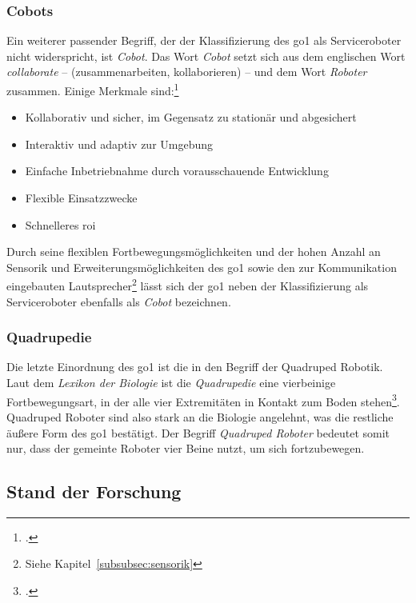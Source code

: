 \subsubsection{Cobots}

Ein weiterer passender Begriff, der der Klassifizierung des \gls{go1} als Serviceroboter nicht widerspricht, ist \emph{Cobot}.
Das Wort \emph{Cobot} setzt sich aus dem englischen Wort \emph{collaborate} -- (zusammenarbeiten, kollaborieren) -- und dem Wort \emph{Roboter}
zusammen.
Einige Merkmale sind:\footcite{statista_robotics_market}

\begin{itemize}
    \item Kollaborativ und sicher, im Gegensatz zu stationär und abgesichert
    \item Interaktiv und adaptiv zur Umgebung
    \item Einfache Inbetriebnahme durch vorausschauende Entwicklung
    \item Flexible Einsatzzwecke
    \item Schnelleres \gls{roi}
\end{itemize}

Durch seine flexiblen Fortbewegungsmöglichkeiten und der hohen Anzahl an Sensorik und Erweiterungsmöglichkeiten des \gls{go1}
sowie den zur Kommunikation eingebauten Lautsprecher\footnote{Siehe Kapitel~\ref{subsubsec:sensorik}}
lässt sich der \gls{go1} neben der Klassifizierung als Serviceroboter ebenfalls als \emph{Cobot} bezeichnen.

\subsubsection{Quadrupedie}

Die letzte Einordnung des \gls{go1} ist die in den Begriff der Quadruped Robotik.
Laut dem \emph{Lexikon der Biologie} ist die \emph{Quadrupedie} eine vierbeinige Fortbewegungsart, in der alle vier
Extremitäten in Kontakt zum Boden stehen\footcite{quadrupedie}.
Quadruped Roboter sind also stark an die Biologie angelehnt, was die restliche äußere Form des \gls{go1} bestätigt.
Der Begriff \emph{Quadruped Roboter} bedeutet somit nur, dass der gemeinte Roboter vier Beine nutzt, um sich fortzubewegen.

\subsection{Stand der Forschung}
\label{subsec:stand-der-forschung}

